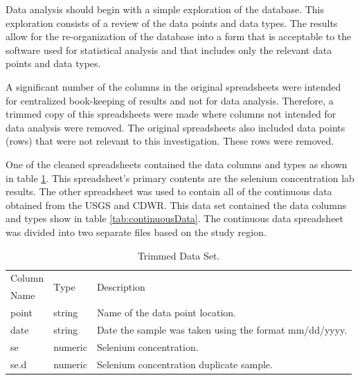 Data analysis should begin with a simple exploration of the database.  This exploration consists of a review of the data points and data types.  The results allow for the re-organization of the database into a form that is acceptable to the software used for statistical analysis and that includes only the relevant data points and data types.  

 A significant number of the columns in the original spreadsheets were intended for centralized book-keeping of results and not for data analysis.  Therefore, a trimmed copy of this spreadsheets were made where columns not intended for data analysis were removed.  The original spreadsheets also included data points (rows) that were not relevant to this investigation.  These rows were removed.

One of the cleaned spreadsheets contained the data columns and types as shown in table \ref{tab:trimmedData}.  This spreadsheet's primary contents are the selenium concentration lab results.  The other spreadsheet was used to contain all of the continuous data obtained from the USGS and CDWR.  This data set contained the data columns and types show in table \ref{tab:continuousData}.  The continuous data spreadsheet was divided into two separate files based on the study region.

\begin{table}[htbp]
	\centering
	\caption[Trimmed Data Set.]{Trimmed Data Set.}
	\label{tab:trimmedData}
	\begin{tabular}{l  l  l}
		\toprule
		Column & \multirow{2}{*}{Type}  & \multirow{2}{*}{Description}\\
		Name
		\\ \toprule
		point & string & Name of the data point location.\\
		date & string & Date the sample was taken using the format mm/dd/yyyy. \\
		se & numeric & Selenium concentration. \\
		se.d & numeric & Selenium concentration duplicate sample.
		\\ \bottomrule
	\end{tabular}
\end{table}

